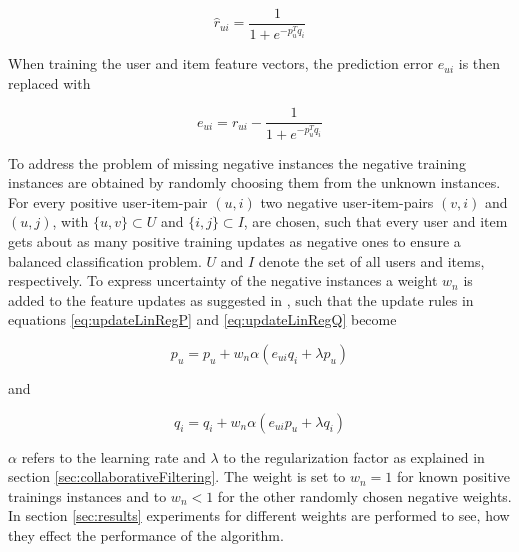 \documentclass[10pt]{reportMaster}
\begin{document}
\begin{equation}
	\hat{r}_{ui} = \frac{1}{1 + e^{-p_u^Tq_i}}
\end{equation}

When training the user and item feature vectors, the prediction error $e_{ui}$ is then replaced with 

\begin{equation}
	e_{ui} = r_{ui} - \frac{1}{1 + e^{-p_u^Tq_i}}
\end{equation}


To address the problem of missing negative instances the negative training instances are obtained by randomly choosing them from the unknown instances.
For every positive user-item-pair $(u, i)$ two negative user-item-pairs $(v, i)$ and $(u,j)$, with $\{u, v\} \subset U$ and $\{i, j\} \subset I$, are chosen, such that every user and item gets about as many positive training updates as negative ones to ensure a balanced classification problem.
$U$ and $I$ denote the set of all users and items, respectively.
To express uncertainty of the negative instances a weight $w_n$ is added to the feature updates as suggested in \cite{occf}, such that the update rules in equations \ref{eq:updateLinRegP} and \ref{eq:updateLinRegQ} become 

\begin{equation}
\label{eq:updateLogRegP}
	p_u = p_u + w_n \alpha (e_{ui} q_i + \lambda p_u)
\end{equation}

and 

\begin{equation}
\label{eq:updateLogRegQ}
	q_i = q_i + w_n \alpha (e_{ui} p_u + \lambda q_i)
\end{equation}

$\alpha$ refers to the learning rate and $\lambda$ to the regularization factor as explained in section \ref{sec:collaborativeFiltering}.
The weight is set to $w_n = 1$ for known positive trainings instances and to $w_n < 1$ for the other randomly chosen negative weights.
In section \ref{sec:results} experiments for different weights are performed to see, how they effect the performance of the algorithm.
\end{document}
